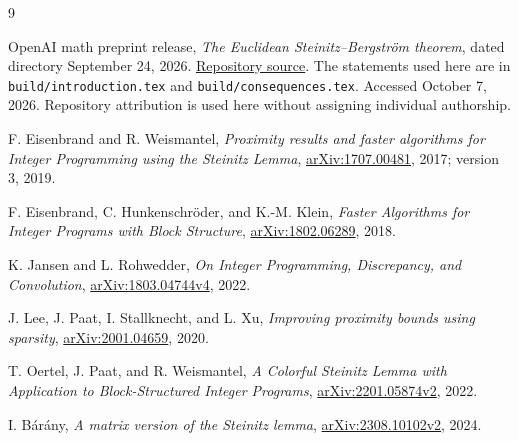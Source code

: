 \documentclass[11pt]{article}
\theoremstyle{definition}
\theoremstyle{remark}
\begin{document}
\begin{thebibliography}{9}
\raggedright

OpenAI math preprint release,
\emph{The Euclidean Steinitz--Bergstr\"om theorem},
dated directory September 24, 2026.
\href{https://github.com/openai/math/tree/main/preprints/The-Euclidean-Steinitz-Bergstrom-theorem-September-24-2026}{Repository source}.
The statements used here are in \texttt{build/introduction.tex} and
\texttt{build/consequences.tex}. Accessed October 7, 2026.
Repository attribution is used here without assigning individual authorship.

F. Eisenbrand and R. Weismantel,
\emph{Proximity results and faster algorithms for Integer Programming
using the Steinitz Lemma},
\href{https://arxiv.org/abs/1707.00481}{arXiv:1707.00481}, 2017;
version 3, 2019.

F. Eisenbrand, C. Hunkenschr\"oder, and K.-M. Klein,
\emph{Faster Algorithms for Integer Programs with Block Structure},
\href{https://arxiv.org/abs/1802.06289}{arXiv:1802.06289}, 2018.

K. Jansen and L. Rohwedder,
\emph{On Integer Programming, Discrepancy, and Convolution},
\href{https://arxiv.org/abs/1803.04744v4}{arXiv:1803.04744v4}, 2022.

J. Lee, J. Paat, I. Stallknecht, and L. Xu,
\emph{Improving proximity bounds using sparsity},
\href{https://arxiv.org/abs/2001.04659}{arXiv:2001.04659}, 2020.

T. Oertel, J. Paat, and R. Weismantel,
\emph{A Colorful Steinitz Lemma with Application to Block-Structured
Integer Programs},
\href{https://arxiv.org/abs/2201.05874v2}{arXiv:2201.05874v2}, 2022.

I. B\'ar\'any,
\emph{A matrix version of the Steinitz lemma},
\href{https://arxiv.org/abs/2308.10102v2}{arXiv:2308.10102v2}, 2024.

\end{thebibliography}
\end{document}
